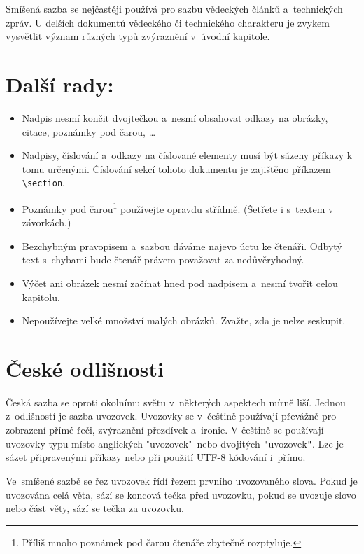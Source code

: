 \documentclass[a4paper, 10pt, twocolumn] {article}
\begin{document}
Smíšená sazba se nejčastěji používá pro sazbu vědeckých článků a~technických zpráv.
U delších dokumentů vědeckého či technického charakteru je zvykem vysvětlit význam různých typů zvýraznění v~úvodní kapitole.
\section{Další rady:}

\begin{itemize}
\item Nadpis nesmí končit dvojtečkou a~nesmí obsahovat odkazy na obrázky, citace, poznámky pod čarou, \dots

\item Nadpisy, číslování a~odkazy na číslované elementy musí být sázeny příkazy k tomu určenými.
Číslování sekcí tohoto dokumentu je zajištěno příkazem \verb|\section|.

\item Poznámky pod čarou\footnote{Příliš mnoho poznámek pod čarou čtenáře zbytečně rozptyluje.} používejte opravdu střídmě.
(Šetřete i s~textem v závorkách.)

\item Bezchybným pravopisem a~sazbou dáváme najevo úctu ke čtenáři.
Odbytý text s~chybami bude čtenář právem považovat za nedůvěryhodný.

\item Výčet ani obrázek nesmí začínat hned pod nadpisem a~nesmí tvořit celou kapitolu.


\item Nepoužívejte velké množství malých obrázků.
Zvažte, zda je nelze seskupit.
\end{itemize}

\section{České odlišnosti}

Česká sazba se oproti okolnímu světu v~některých aspektech mírně liší.
Jednou z~odlišností je sazba uvozovek.
Uvozovky se v~češtině používají převážně pro zobrazení přímé řeči, zvýraznění přezdívek a~ironie.
V češtině se používají uvozovky typu  místo anglických "uvozovek"~nebo dvojitých \verb|"|uvozovek\verb|"|.
Lze je sázet připravenými příkazy nebo při použití UTF-8 kódování i~přímo.

Ve~smíšené sazbě se řez uvozovek řídí řezem prvního uvozovaného slova.
Pokud je uvozována celá věta, sází se koncová tečka před uvozovku, pokud se uvozuje slovo nebo část věty, sází se tečka za uvozovku.
\end{document}
